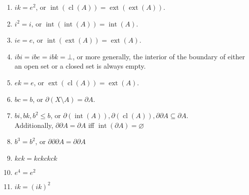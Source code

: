 \documentclass{treatise}
\begin{document}
\begin{proposition}
\begin{enumerate}
\begin{enumerate}
        \\
        \item $ik = e^2$, or $\operatorname{int}(\operatorname{cl}(A)) = \operatorname{ext}(\operatorname{ext}(A))$.
        \item $i^2 = i$, or $\operatorname{int}(\operatorname{int}(A)) = \operatorname{int}(A)$.
        \item $ie = e$, or $\operatorname{int}(\operatorname{ext}(A)) = \operatorname{ext}(A)$.
        \item $ibi = ibe = ibk = \bot$, or more generally, the interior of the boundary of either an open set or a closed set is always empty.
        \\
        \item $ek = e$, or $\operatorname{ext}(\operatorname{cl}(A)) = \operatorname{ext}(A)$.
        \\
        \item $bc = b$, or $\partial (X \setminus A) = \partial A$.
        \item $bi, bk, b^2 \leq b$, or $\partial(\operatorname{int}(A)), \partial(\operatorname{cl}(A)), \partial\partial A \subseteq \partial A$.
        \\
        Additionally, $\partial \partial A = \partial A$ iff $\operatorname{int}(\partial A) = \varnothing$
        \item $b^3 = b^2$, or $\partial \partial \partial A = \partial \partial A$
        \\
        \item $kck = kckckck$
        \item $e^4 = e^2$
        \item $ik = (ik)^2$
    \end{enumerate}
\end{enumerate}
\end{proposition}
\end{document}
